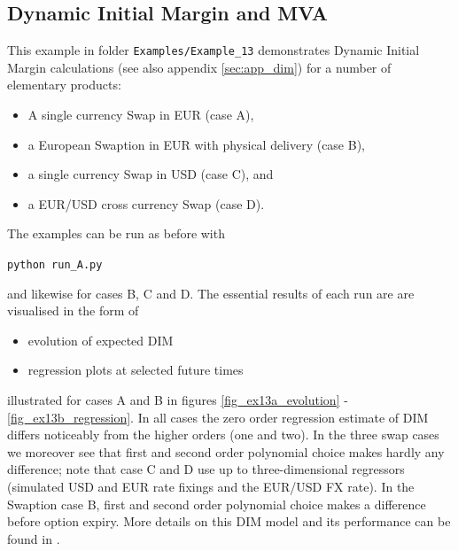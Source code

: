 \documentclass[12pt, a4paper]{article}
\begin{document}
\subsection{Dynamic Initial Margin and MVA}\label{sec:dim}

This example in folder {\tt Examples/Example\_13} demonstrates Dynamic Initial Margin calculations (see also appendix
\ref{sec:app_dim}) for a number of elementary products:
\begin{itemize}
\item A single currency Swap in EUR (case A), 
\item a European Swaption in EUR with physical delivery (case B), 
\item a single currency Swap in USD (case C), and 
\item a EUR/USD cross currency Swap (case D).
\end{itemize}

The examples can be run as before with 

\medskip
\centerline{\tt python run\_A.py} 

\medskip
and likewise for cases B, C and D. The essential results of each run are are visualised in the form of 
\begin{itemize}
\item evolution of expected DIM
\item regression plots at selected future times 
\end{itemize}
illustrated for cases A and B in figures \ref{fig_ex13a_evolution} - \ref{fig_ex13b_regression}. In all cases the zero
order regression estimate of DIM differs noticeably from the higher orders (one and two). In the three swap cases we
moreover see that first and second order polynomial choice makes hardly any difference; note that case C and D use up to
three-dimensional regressors (simulated USD and EUR rate fixings and the EUR/USD FX rate). In the Swaption case B, first
and second order polynomial choice makes a difference before option expiry. More details on this DIM model and its performance can be found in \cite{Anfuso2016,LichtersEtAl}.
 
\end{document}
